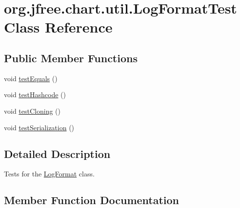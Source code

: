\hypertarget{classorg_1_1jfree_1_1chart_1_1util_1_1_log_format_test}{}\section{org.\+jfree.\+chart.\+util.\+Log\+Format\+Test Class Reference}
\label{classorg_1_1jfree_1_1chart_1_1util_1_1_log_format_test}
\subsection*{Public Member Functions}
\begin{DoxyCompactItemize}
\item 
void \mbox{\hyperlink{classorg_1_1jfree_1_1chart_1_1util_1_1_log_format_test_a863d6bea6f581360cf886bc02315a997}{test\+Equals}} ()
\item 
void \mbox{\hyperlink{classorg_1_1jfree_1_1chart_1_1util_1_1_log_format_test_a2baaf6ac51265e48db376bad83bc8d84}{test\+Hashcode}} ()
\item 
void \mbox{\hyperlink{classorg_1_1jfree_1_1chart_1_1util_1_1_log_format_test_ac3173f4a8442d9b0cb4877ac6d720d83}{test\+Cloning}} ()
\item 
void \mbox{\hyperlink{classorg_1_1jfree_1_1chart_1_1util_1_1_log_format_test_a61bed806453c380830ad2c23790e2f0c}{test\+Serialization}} ()
\end{DoxyCompactItemize}


\subsection{Detailed Description}
Tests for the \mbox{\hyperlink{classorg_1_1jfree_1_1chart_1_1util_1_1_log_format}{Log\+Format}} class. 

\subsection{Member Function Documentation}
\mbox{\label{classorg_1_1jfree_1_1chart_1_1util_1_1_log_format_test_ac3173f4a8442d9b0cb4877ac6d720d83}} 

